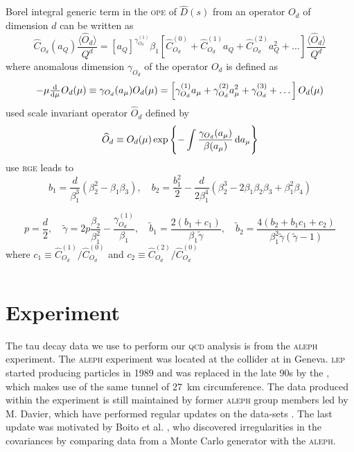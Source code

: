 \documentclass[../../index.tex]{subfiles}
\begin{document}
Borel integral generic term in the \textsc{ope} of \(\widehat D(s)\) from an
operator \(O_d\) of dimension \(d\) can be written as
\begin{equation}
  \widehat C_{O_d}(a_Q) \frac{\langle \widehat O_d \rangle}{Q^d} = [a_Q]^{\gamma_{O_d}^{(1)}}{\beta_1}
  \left[ \widehat C_{O_d}^{(0)} + \widehat C_{O_d}^{(1)}a_Q + \widehat C_{O_d}^{(2)}a_Q^2 + \dots \right]
  \frac{\langle \widehat O_d \rangle}{Q^d}
\end{equation}
where anomalous dimension \(\gamma_{O_d}\) of the operator \(O_d\) is defined as
\begin{equation}
  -\mu \od{}{\mu} O_d(\mu) \equiv \gamma_{O_d}(a_\mu) O_d(\mu)
  = \left[ \gamma_{O_d}^{(1)} a_\mu  + \gamma_{O_d}^{(2)} a^2_{\mu} + \gamma_{O_d}^{(3)} + \dots \right] O_d(\mu)
\end{equation}
used scale invariant operator \(\widehat O_d\) defined by
\begin{equation}
  \widehat O_d \equiv O_d(\mu) \exp \left\{ - \int \frac{\gamma_{O_d}(a_\mu)}{\beta(a_\mu)} \dif a_\mu \right\}
\end{equation}
use \textsc{rge} leads to
\begin{equation}
  b_1 = \frac{d}{\beta_1^3}(\beta_2^2 - \beta_1\beta_3),
  \quad b_2 = \frac{b_1^2}{2} - \frac{d}{2 \beta_1^4} (\beta_2^3 - 2\beta_1\beta_2\beta_3 + \beta_1^2 \beta_4)
\end{equation}



\begin{equation}
  p = \frac{d}{2}, \quad \tilde\gamma = 2 p \frac{\beta_2}{\beta_1^2} - \frac{\gamma_{O_d}^{(1)}}{\beta_1},
  \quad \tilde b_1 = \frac{2(b_1 + c_1)}{\beta_1 \tilde\gamma},
  \quad \tilde b_2 = \frac{4(b_2 + b_1c_1 + c_2)}{\beta_1^2 \tilde \gamma(\tilde \gamma -1)}
\end{equation}
where \(c_1 \equiv \widehat C_{O_d}^{(1)}/ \widehat C_{O_d}^{(0)}\) and \(c_2
\equiv \widehat C_{O_d}^{(2)}/ \widehat C_{O_d}^{(0)} \)

\begin{equation}
\end{equation}


\section{Experiment}
The tau decay data we use to perform our \textsc{qcd} analysis is from the
\textsc{aleph} experiment. The \textsc{aleph} experiment was located at the
 collider at  in Geneva. \textsc{lep} started producing
particles in 1989 and was replaced in the late 90s by the
, which makes use of the same tunnel of
\SI{27}{\kilo\meter} circumference. The data produced within the experiment is
still maintained by former \textsc{aleph} group members led by M. Davier, which
have performed regular updates on the data-sets
\cite{Davier2013,Davier2008,Aleph2005}. The last update was motivated by Boito
et al. \cite{Boito2010}, who discovered irregularities in the covariances by
comparing data from a Monte Carlo generator with the \textsc{aleph}.
\end{document}
